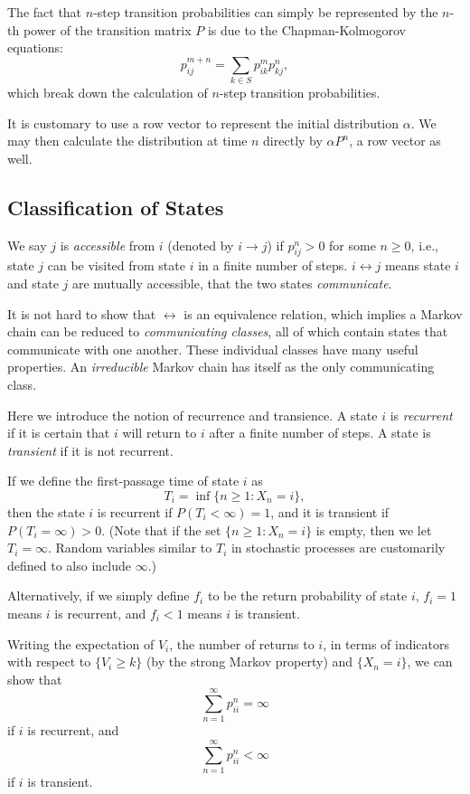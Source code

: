 \documentclass[11pt]{article}
\begin{document}
The fact that $n$-step transition probabilities can simply be represented by the $n$-th power of the transition matrix $P$ is due to the Chapman-Kolmogorov equations:
\[
p_{ij}^{m+n}=\sum_{k\in S}p_{ik}^{m}p_{kj}^{n},
\]
which break down the calculation of $n$-step transition probabilities.

It is customary to use a row vector to represent the initial distribution $\alpha $. We may then calculate the distribution at time $n$ directly by $\alpha P^{n}$, a row vector as well.

\subsection{Classification of States}
We say $j$ is \textit{accessible} from $i$ (denoted by $i\rightarrow j$) if $p_{ij}^{n}>0$ for some $n\geq 0$, i.e., state $j$ can be visited from state $i$ in a finite number of steps. $i \leftrightarrow j$ means state $i$ and state $j$ are mutually accessible, that the two states \textit{communicate}.

It is not hard to show that $\leftrightarrow$ is an equivalence relation, which implies a Markov chain can be reduced to \textit{communicating classes}, all of which contain states that communicate with one another. These individual classes have many useful properties. An \textit{irreducible} Markov chain has itself as the only communicating class.

Here we introduce the notion of recurrence and transience. A state $i$ is \textit{recurrent} if it is certain that $i$ will return to $i$ after a finite number of steps. A state is \textit{transient} if it is not recurrent.

If we define the first-passage time of state $i$ as
\[
T_{i}=\inf \{n\geq 1:X_{n}=i\},
\]
then the state $i$ is recurrent if $P(T_{i}<\infty )=1$, and it is transient if $P(T_{i}=\infty )>0$. (Note that if the set $\{n\geq 1:X_{n}=i\}$ is empty, then we let $T_{i}=\infty $. Random variables similar to $T_{i}$ in stochastic processes are customarily defined to also include $\infty $.)

Alternatively, if we simply define $f_{i}$ to be the return probability of state $i$, $f_{i}=1$ means $i$ is recurrent, and $f_{i}<1$ means $i$ is transient.

Writing the expectation of $V_{i}$, the number of returns to $i$, in terms of indicators with respect to $\{V_{i}\geq k\}$ (by the strong Markov property) and $\{X_{n}=i\}$, we can show that
\[
\sum_{n=1}^{\infty }p_{ii}^{n}=\infty 
\]
if $i$ is recurrent, and
\[
\sum_{n=1}^{\infty }p_{ii}^{n}<\infty 
\]
if $i$ is transient.
\end{document}
